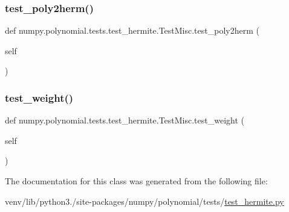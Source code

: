 \subsubsection{\texorpdfstring{test\+\_\+poly2herm()}{test\_poly2herm()}}
{\footnotesize\ttfamily def numpy.\+polynomial.\+tests.\+test\+\_\+hermite.\+Test\+Misc.\+test\+\_\+poly2herm (\begin{DoxyParamCaption}\item[{}]{self }\end{DoxyParamCaption})}

\mbox{\label{classnumpy_1_1polynomial_1_1tests_1_1test__hermite_1_1TestMisc_a1e349efb626a988fd7afed80ab034f44}} 
\subsubsection{\texorpdfstring{test\+\_\+weight()}{test\_weight()}}
{\footnotesize\ttfamily def numpy.\+polynomial.\+tests.\+test\+\_\+hermite.\+Test\+Misc.\+test\+\_\+weight (\begin{DoxyParamCaption}\item[{}]{self }\end{DoxyParamCaption})}



The documentation for this class was generated from the following file\+:\begin{DoxyCompactItemize}
\item 
venv/lib/python3./site-\/packages/numpy/polynomial/tests/\hyperlink{test__hermite_8py}{test\+\_\+hermite.\+py}\end{DoxyCompactItemize}
